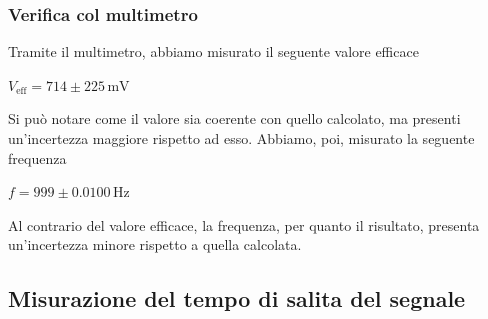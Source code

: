 \documentclass[a4paper]{article}
\begin{document}
			\subsubsection{Verifica col multimetro}
				Tramite il multimetro, abbiamo misurato il seguente valore efficace
				\newline
				\begin{center}
					$ V_{\mathrm{eff}} = 714 \pm 225 \, \mathrm{mV} $
				\end{center}
				Si può notare come il valore sia coerente con quello calcolato, ma presenti un'incertezza maggiore rispetto ad esso.
				\newline
				Abbiamo, poi, misurato la seguente frequenza
				\newline
				\begin{center}
					$ f = 999 \pm 0.0100 \, \mathrm{Hz} $
				\end{center}
				Al contrario del valore efficace, la frequenza, per quanto il risultato, presenta un'incertezza minore rispetto a quella calcolata.
		\subsection{Misurazione del tempo di salita del segnale}
\end{document}
